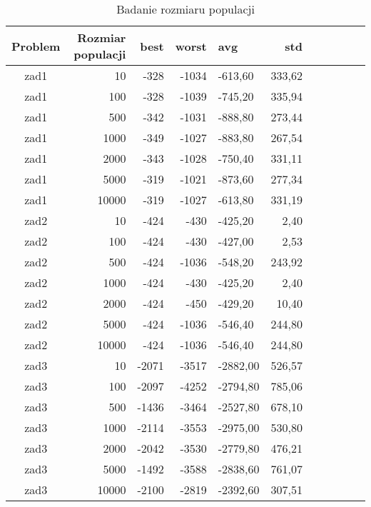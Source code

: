 \documentclass[12pt,a4paper]{article}
\begin{document}
\begin{table}[htbp]
  \centering
    \begin{tabular}{crrrlrrrrrr}
    \multicolumn{1}{p{3.715em}}{\textbf{Problem}} & \multicolumn{1}{p{5.93em}}{\textbf{Rozmiar populacji}} & \multicolumn{1}{p{2.645em}}{\textbf{best}} & \multicolumn{1}{p{2.93em}}{\textbf{worst}} & \multicolumn{1}{p{3.785em}}{\textbf{avg}} & \multicolumn{1}{p{3.5em}}{\textbf{std}} \\
    \midrule
    zad1  & 10     & -328  & -1034 & -613,60 & 333,62 \\
    zad1  & 100    & -328  & -1039 & -745,20 & 335,94 \\
    zad1  & 500    & -342  & -1031 & -888,80 & 273,44 \\
    zad1  & 1000   & -349  & -1027 & -883,80 & 267,54 \\
    zad1  & 2000   & -343  & -1028 & -750,40 & 331,11 \\
    zad1  & 5000   & -319  & -1021 & -873,60 & 277,34 \\
    zad1  & 10000  & -319  & -1027 & -613,80 & 331,19 \\
    \midrule
    zad2  & 10     & -424  & -430  & -425,20 & 2,40 \\
    zad2  & 100    & -424  & -430  & -427,00 & 2,53 \\
    zad2  & 500    & -424  & -1036 & -548,20 & 243,92 \\
    zad2  & 1000   & -424  & -430  & -425,20 & 2,40 \\
    zad2  & 2000   & -424  & -450  & -429,20 & 10,40 \\
    zad2  & 5000   & -424  & -1036 & -546,40 & 244,80 \\
    zad2  & 10000  & -424  & -1036 & -546,40 & 244,80 \\
    \midrule
    zad3  & 10     & -2071 & -3517 & -2882,00 & 526,57 \\
    zad3  & 100    & -2097 & -4252 & -2794,80 & 785,06 \\
    zad3  & 500    & -1436 & -3464 & -2527,80 & 678,10 \\
    zad3  & 1000   & -2114 & -3553 & -2975,00 & 530,80 \\
    zad3  & 2000   & -2042 & -3530 & -2779,80 & 476,21 \\
    zad3  & 5000   & -1492 & -3588 & -2838,60 & 761,07 \\
    zad3  & 10000  & -2100 & -2819 & -2392,60 & 307,51 \\
    \end{tabular}%
  \caption{Badanie rozmiaru populacji}
  \label{tab:addlabel}%
\end{table}%
\end{document}
